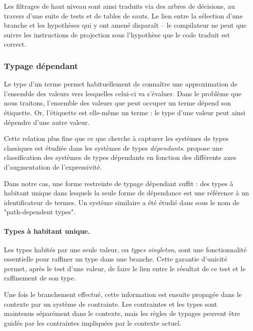 Les filtrages de haut niveau sont ainsi traduits via des arbres de décisions,
au travers d'une suite de tests et de tables de sauts.  Le lien entre la
sélection d'une branche et les hypothèses qui y ont amené disparaît -- le
compilateur ne peut que suivre les instructions de projection sous l'hypothèse
que le code traduit est correct.

\subsubsection{Typage dépendant}

Le type d'un terme permet habituellement de connaître une approximation de
l'ensemble des valeurs vers lesquelles celui-ci va s'évaluer. Dans le problème
que nous traitons, l'ensemble des valeurs que peut occuper un terme dépend son
étiquette. Or, l'étiquette est elle-même un terme : le type d'une valeur peut
ainsi dépendre d'une autre valeur.

Cette relation plus fine que ce que cherche à capturer les systèmes de types
classiques est étudiée dans les systèmes de types \emph{dépendants}.
\cite{LambdaCube} propose une classification des systèmes de types dépendants
en fonction des différents axes d'augmentation de l'expressivité.

Dans notre cas, une forme restreinte de typage dépendant suffit : des types à
habitant unique dans lesquels la seule forme de dépendance est une référence à
un identificateur de termes.
Un système similaire a été étudié  dans \cite{Odersky02anominal} sous le nom de
"path-dependent types".

\paragraph{Types à habitant unique.}
Les types habités par une seule valeur, ou \emph{types singleton}, sont une
fonctionnalité essentielle pour raffiner un type dans une branche.
Cette garantie d'unicité permet, après le test d'une valeur, de faire le lien
entre le résultat de ce test et le raffinement de son type.

Une fois le branchement effectué, cette information est ensuite propagée dans
le contexte par un système de contrainte. Les contraintes et les types sont
maintenus séparément dans le contexte, mais les règles de typages peuvent être
guidés par les contraintes impliquées par le contexte actuel.

